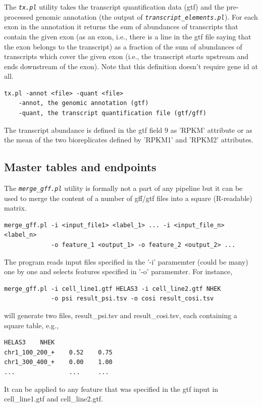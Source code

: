 \documentclass{article}
\newcommand{\prog}[1]{{\tt\em #1}}
\begin{document}
The \prog{tx.pl} utility takes the transcript quantification data (gtf) and the pre-processed genomic annotation (the output of
\prog{transcript\_elements.pl}). For each exon in the annotation it returns the sum of abundances of transcripts that contain 
the given exon (as an exon, i.e., there is a line in the gtf file saying that the exon belongs to the transcript) as a fraction 
of the sum of abundances of transcripts which cover the given exon (i.e., the transcript starts upstream and ends downstream of the 
exon). Note that this definition doesn't require gene id at all.

\begin{verbatim}
tx.pl -annot <file> -quant <file>
	-annot, the genomic annotation (gtf)
	-quant, the transcript quantification file (gtf/gff)
\end{verbatim}

The transcript abundance is defined in the gtf field 9 as 'RPKM' attribute or as the mean of the two bioreplicates defined by
'RPKM1' and 'RPKM2' attributes.


\subsection{Master tables and endpoints}
The \prog{merge\_gff.pl} utility is formally not a part of any pipeline but it can be used to merge the content of a number of gff/gtf 
files into a square (R-readable) matrix.
\begin{verbatim}
merge_gff.pl -i <input_file1> <label_1> ... -i <input_file_n> <label_n>
             -o feature_1 <output_1> -o feature_2 <output_2> ...
\end{verbatim}
The program reads input files specified in the '-i' paramemter (could be many) one by one and selects features specified in '-o' paramemter. For instance,
\begin{verbatim}
merge_gff.pl -i cell_line1.gtf HELAS3 -i cell_line2.gtf NHEK 
             -o psi result_psi.tsv -o cosi result_cosi.tsv
\end{verbatim}
will generate two files, result\_psi.tsv and result\_cosi.tsv, each containing a square table, e.g.,
\begin{verbatim}
HELAS3    NHEK
chr1_100_200_+    0.52    0.75
chr1_300_400_+    0.00    1.00
...               ...     ...
\end{verbatim}
It can be applied to any feature that was specified in the gtf input in cell\_line1.gtf and cell\_line2.gtf.
\end{document}
